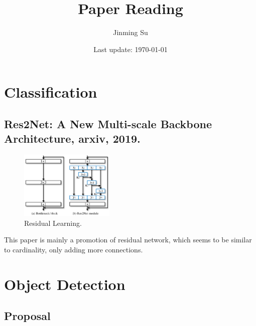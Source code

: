 \documentclass[10pt,onecolumn]{book}
\begin{document}
\title{\textbf{Paper Reading}}
\author{Jinming Su}
\date{Last update: \today}

\maketitle

\thispagestyle{empty}
\newpage
{}
\newpage
\tableofcontents
\newpage
\listoftodos

\newpage
{}
\mainmatter

\chapter{Classification}
\section{Res2Net: A New Multi-scale Backbone Architecture, arxiv, 2019.}
\begin{figure}[h]
\centering
\includegraphics[width=0.4\textwidth]{figures_paper_reading/Res2Net:_A_New_Multi-scale_Backbone_Architecture.png}
\caption{Residual Learning.}
\label{fig:1-1_residual_learning}
\end{figure}
This paper is mainly a promotion of residual network, which seems to be similar to cardinality, only adding more connections.

\chapter{Object Detection}
\section{Proposal}
\end{document}
